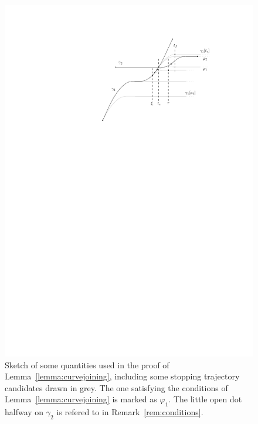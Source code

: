 \documentclass[a4paper]{article}
\theoremstyle{definition}
\theoremstyle{plain}
\begin{document}
\begin{figure}
  \centering
  \includegraphics[scale=1.0]{figures/motion/rough/curvejoiningproof}
  \caption{Sketch of some quantities used in the proof of
    Lemma~\ref{lemma:curvejoining}, including some stopping trajectory
    candidates drawn in grey. The one satisfying the conditions of
    Lemma~\ref{lemma:curvejoining} is marked as $\varphi_{1}$. The little open
    dot halfway on $\gamma_{2}$ is refered to in Remark~\ref{rem:conditions}.}%
  \label{fig:proof}
\end{figure}
\end{document}

